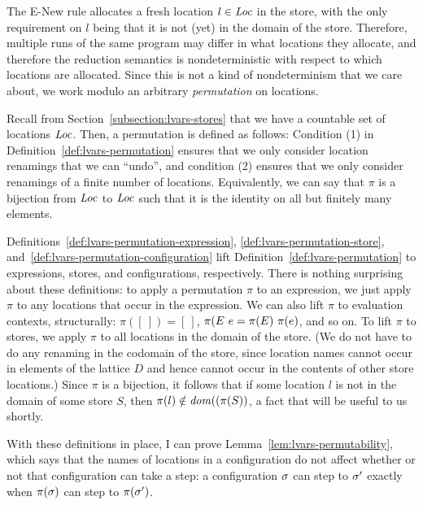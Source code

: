 The {\sc E-New} rule allocates a fresh location $l \in \mathit{Loc}$ in the
store, with the only requirement on $l$ being that it is not (yet) in
the domain of the store.  Therefore, multiple runs of the same program
may differ in what locations they allocate, and therefore the
reduction semantics is nondeterministic with respect to which
locations are allocated.  Since this is not a kind of nondeterminism
that we care about, we work modulo an arbitrary \emph{permutation} on
locations.

Recall from Section~\ref{subsection:lvars-stores} that we have a
countable set of locations $\mathit{Loc}$.  Then, a permutation is defined as
follows:
\LVarsDefPermutation
Condition (1) in Definition~\ref{def:lvars-permutation} ensures that
we only consider location renamings that we can ``undo'', and
condition (2) ensures that we only consider renamings of a finite
number of locations.  Equivalently, we can say that $\pi$ is a
bijection from $\mathit{Loc}$ to $\mathit{Loc}$ such that it is the identity on all
but finitely many elements.

Definitions~\ref{def:lvars-permutation-expression},
\ref{def:lvars-permutation-store},
and~\ref{def:lvars-permutation-configuration} lift
Definition~\ref{def:lvars-permutation} to expressions, stores, and
configurations, respectively.  There is nothing surprising about these
definitions: to apply a permutation $\pi$ to an expression, we just
apply $\pi$ to any locations that occur in the expression.  We can
also lift $\pi$ to evaluation contexts, structurally: $\pi([~]) =
[~]$, $\pi(E~e = \pi(E)~\pi(e)$, and so on.  To lift
$\pi$ to stores, we apply $\pi$ to all locations in the domain of the
store.  (We do not have to do any renaming in the codomain of the
store, since location names cannot occur in elements of the lattice
$D$ and hence cannot occur in the contents of other store locations.)
Since $\pi$ is a bijection, it follows that if some location $l$ is
not in the domain of some store $S$, then $\pi(l) \notin
\mathit{dom}((\pi(S))$, a fact
that will be useful to us shortly.

\LVarsDefPermutationExpression

\LVarsDefPermutationStore

\LVarsDefPermutationConfiguration

With these definitions in place, I can prove
Lemma~\ref{lem:lvars-permutability}, which says that the names of
locations in a configuration do not affect whether or not that
configuration can take a step: a configuration $\sigma$ can step to
$\sigma'$ exactly when $\pi(\sigma)$ can step to $\pi(\sigma')$.

